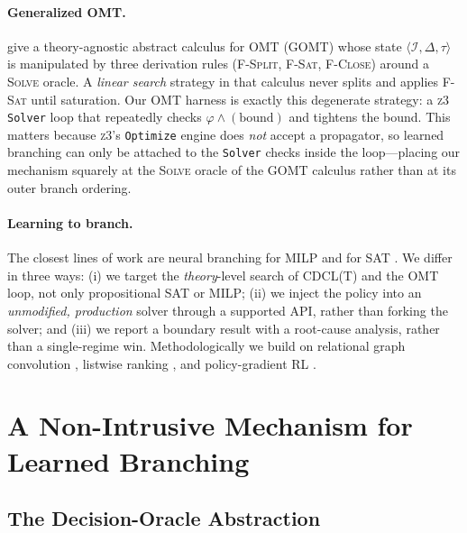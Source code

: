 \documentclass[letterpaper]{article} %
\theoremstyle{definition}
\theoremstyle{plain}
\theoremstyle{remark}
\newcommand{\solver}{\textsc{z3}}
\begin{document}
\paragraph{Generalized OMT.}
\citet{gomt2024} give a theory-agnostic abstract calculus for OMT (GOMT)
whose state $\langle \mathcal{I}, \Delta, \tau\rangle$ is manipulated by
three derivation rules (\textsc{F-Split}, \textsc{F-Sat}, \textsc{F-Close})
around a \textsc{Solve} oracle. A \emph{linear search} strategy in that
calculus never splits and applies \textsc{F-Sat} until saturation. Our OMT
harness is exactly this degenerate strategy: a \solver{} \texttt{Solver}
loop that repeatedly checks $\varphi \wedge (\text{bound})$ and tightens the
bound. This matters because \solver{}'s \texttt{Optimize} engine does
\emph{not} accept a propagator, so learned branching can only be attached to
the \texttt{Solver} checks inside the loop---placing our mechanism squarely
at the \textsc{Solve} oracle of the GOMT calculus rather than at its outer
branch ordering.

\paragraph{Learning to branch.}
The closest lines of work are neural branching for MILP
\citep{gasse2019exact,nair2020solving} and for SAT
\citep{selsam2019neurosat,kurin2020graphqsat}. We differ in three ways: (i)
we target the \emph{theory}-level search of \textsc{CDCL(T)} and the OMT
loop, not only propositional SAT or MILP; (ii) we inject the policy into an
\emph{unmodified, production} solver through a supported API, rather than
forking the solver; and (iii) we report a boundary result with a root-cause
analysis, rather than a single-regime win. Methodologically we build on
relational graph convolution \citep{schlichtkrull2018rgcn}, listwise ranking
\citep{cao2007listnet}, and policy-gradient RL \citep{williams1992reinforce}.

\section{A Non-Intrusive Mechanism for Learned Branching}
\label{sec:mechanism}

\subsection{The Decision-Oracle Abstraction}
\end{document}
